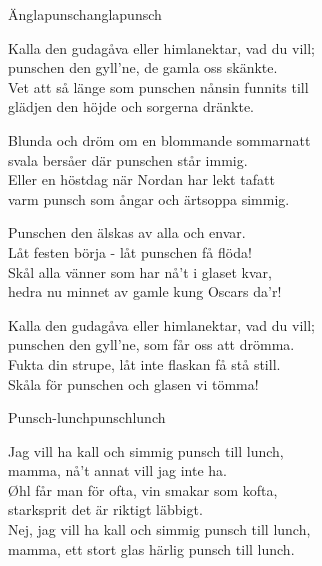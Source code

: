 \begin{song}{Änglapunsch}{anglapunsch}
\begin{vers}
Kalla den gudagåva eller himlanektar, vad du vill;\\
punschen den gyll'ne, de gamla oss skänkte.\\
Vet att så länge som punschen nånsin funnits till\\
glädjen den höjde och sorgerna dränkte.\\
\end{vers}
\begin{vers}
Blunda och dröm om en blommande sommarnatt\\
svala bersåer där punschen står immig.\\
Eller en höstdag när Nordan har lekt tafatt\\
varm punsch som ångar och ärtsoppa simmig.\\
\end{vers}
\begin{vers}
Punschen den älskas av alla och envar.\\
Låt festen börja - låt punschen få flöda!\\
Skål alla vänner som har nå't i glaset kvar,\\
hedra nu minnet av gamle kung Oscars da'r!\\
\end{vers}
\begin{vers}
Kalla den gudagåva eller himlanektar, vad du vill;\\
punschen den gyll'ne, som får oss att drömma.\\
Fukta din strupe, låt inte flaskan få stå still.\\
Skåla för punschen och glasen vi tömma!\\
\end{vers}
\end{song}

\newpage

\begin{song}{Punsch-lunch}{punschlunch}
\begin{vers}
Jag vill ha kall och simmig punsch till lunch,\\
mamma, nå't annat vill jag inte ha.\\
Øhl får man för ofta, vin smakar som kofta,\\
starksprit det är riktigt läbbigt.\\
Nej, jag vill ha kall och simmig punsch till lunch,\\
mamma, ett stort glas härlig punsch till lunch.\\
\end{vers}
\end{song}

